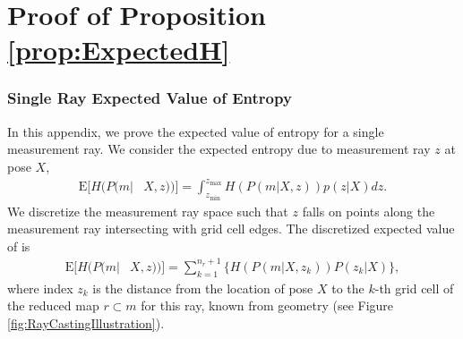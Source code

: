\appendix
\doublespacing
\chapter{Proof of Proposition \ref{prop:ExpectedH}}

\subsection{Single Ray Expected Value of Entropy}

In this appendix, we prove the expected value of entropy for a single measurement ray. We consider the expected entropy due to measurement ray $z$ at pose $X$,
\begin{align}
\label{eqn:HRayInt}
\text{E}[H(P(m|&X,z))]
=\int_{z_\text{min}}^{z_\text{max}}
H(P(m|X,z))p(z|X)
dz.
\end{align}
We discretize the measurement ray space such that $z$ falls on points along the measurement ray intersecting with grid cell edges.
The discretized expected value of  is
\begin{align}
\label{eqn:DiscExpEntropyRayAppendix}
\text{E}[H(P(m|&X,z))]=\sum_{k=1}^{n_{r}+1}\bigg\{H(P(m|X,z_{k}))P(z_{k}|X)\bigg\},
\end{align}
where index $z_{k}$ is the distance from the location of pose $X$ to the $k$-th grid cell of the reduced map $r\subset m$ for this ray, known from geometry (see Figure \ref{fig:RayCastingIllustration}).

